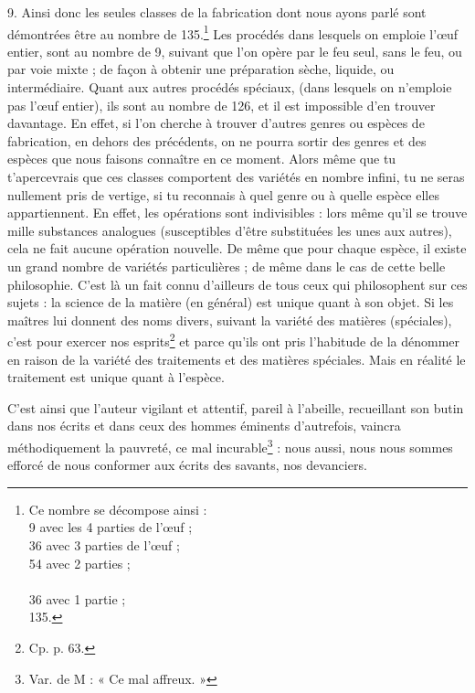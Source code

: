 \documentclass[a4paper, 11pt, oneside, polutonikogreek, french]{article}
\begin{document}
9. Ainsi donc les seules classes de la fabrication dont nous ayons parlé sont démontrées être au nombre de 135.\footnote{Ce nombre se décompose ainsi :\\\hspace*{5mm}9 avec les 4 parties de l'œuf ;\\\hspace*{5mm}36 avec 3 parties de l'œuf ;\\\hspace*{5mm}54 avec 2 parties ;\\\hspace*{5mm}\\\hspace*{5mm}36 avec 1 partie ;\\\hspace*{5mm}135.} Les procédés dans lesquels on emploie l'œuf entier, sont au nombre de 9, suivant que l'on opère par le feu seul, sans le feu, ou par voie mixte ; de façon à obtenir une préparation sèche, liquide, ou intermédiaire. Quant aux autres procédés spéciaux, (dans lesquels on n'emploie pas l'œuf entier), ils sont au nombre de 126, et il est impossible d'en trouver davantage. En effet, si l'on cherche à trouver d'autres genres ou espèces de fabrication, en dehors des précédents, on ne pourra sortir des genres et des espèces que nous faisons connaître en ce moment. Alors même que tu t'apercevrais que ces classes comportent des variétés en nombre infini, tu ne seras nullement pris de vertige, si tu reconnais à quel genre ou à quelle espèce elles appartiennent. En effet, les opérations sont indivisibles : lors même qu'il se trouve mille substances analogues (susceptibles d'être substituées les unes aux autres), cela ne fait aucune opération nouvelle. De même que pour chaque espèce, il existe un grand nombre de variétés particulières ; de même dans le cas de cette belle philosophie. C'est là un fait connu d'ailleurs de tous ceux qui philosophent sur ces sujets : la science de la matière (en général) est unique quant à son objet. Si les maîtres lui donnent des noms divers, suivant la variété des matières (spéciales), c'est pour exercer nos esprits\footnote{Cp. p. 63.} et parce qu'ils ont pris l'habitude de la dénommer en raison de la variété des traitements et des matières spéciales. Mais en réalité le traitement est unique quant à l'espèce.

C'est ainsi que l'auteur vigilant et attentif, pareil à l'abeille, recueillant son butin dans nos écrits et dans ceux des hommes éminents d'autrefois, vaincra méthodiquement la pauvreté, ce mal incurable\footnote{Var. de M : « Ce mal affreux. »} : nous aussi, nous nous sommes efforcé de nous conformer aux écrits des savants, nos devanciers.
\end{document}
